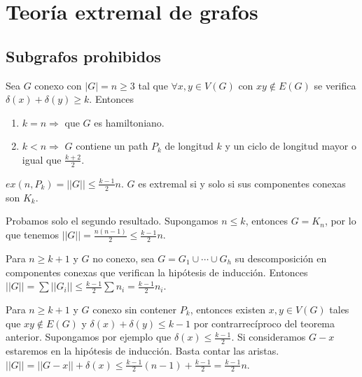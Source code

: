 \documentclass[TGyGC.tex]{subfiles}
\begin{document}
\chapter{Teoría extremal de grafos}
\section{Subgrafos prohibidos}
\begin{teorema}
Sea $G$ conexo con $|G|=n\geq 3$ tal que $\forall x, y\in V(G)$ con $xy\notin E(G)$ se verifica $\delta(x)+\delta(y)\geq k$. Entonces 

\begin{enumerate}
\item $k=n\Rightarrow$ que $G$ es hamiltoniano.
\item $k<n\Rightarrow$ $G$ contiene un path $P_k$ de longitud $k$ y un ciclo de longitud mayor o igual que $\frac{k+2}{2}$. 
\end{enumerate}
\end{teorema}

\begin{teorema}
$ex(n,P_k)=||G||\leq\frac{k-1}{2}n$. $G$ es extremal si y solo si sus componentes conexas son $K_k$. 
\end{teorema}

\begin{dem}
Probamos solo el segundo resultado. Supongamos $n\leq k$, entonces $G=K_n$, por lo que tenemos $||G||=\frac{n(n-1)}{2}\leq\frac{k-1}{2}n$.

Para $n\geq k+1$ y $G$ no conexo, sea $G=G_1\cup\cdots \cup G_h$ su descomposición en componentes conexas que verifican la hipótesis de inducción. Entonces $||G||=\sum||G_i||\leq\frac{k-1}{2}\sum n_i=\frac{k-1}{2}n_i$.

Para $n\geq k+1$ y $G$ conexo sin contener $P_k$, entonces existen $x,y\in V(G)$ tales que $xy\notin E(G)$ y $\delta(x)+\delta(y)\leq k-1$ por contrarrecíproco del teorema anterior. Supongamos por ejemplo que $\delta(x)\leq\frac{k-1}{2}$. Si consideramos $G-x$ estaremos en la hipótesis de inducción. Basta contar las aristas. $||G||=||G-x||+\delta(x)\leq\frac{k-1}{2}(n-1)+\frac{k-1}{2}=\frac{k-1}{2}n$.




\end{dem}
\end{document}
